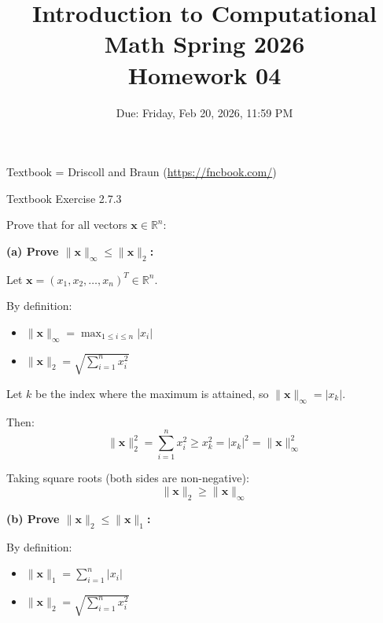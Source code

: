 \documentclass[reqno, answers]{exam}
\title{Introduction to Computational Math Spring 2026 \\ Homework 04}
\date{Due: Friday, Feb 20, 2026, 11:59 PM}
\author{}
\begin{document}
\maketitle
\thispagestyle{empty}

Textbook = Driscoll and Braun (\url{https://fncbook.com/})

\begin{questions}

\question Textbook Exercise 2.7.3

Prove that for all vectors $\mathbf{x} \in \mathbb{R}^n$:

\begin{solution}
\textbf{(a) Prove $\|\mathbf{x}\|_\infty \leq \|\mathbf{x}\|_2$:}

Let $\mathbf{x} = (x_1, x_2, \ldots, x_n)^T \in \mathbb{R}^n$.

By definition:
\begin{itemize}
    \item $\|\mathbf{x}\|_\infty = \max_{1 \leq i \leq n} |x_i|$
    \item $\|\mathbf{x}\|_2 = \sqrt{\sum_{i=1}^n x_i^2}$
\end{itemize}

Let $k$ be the index where the maximum is attained, so $\|\mathbf{x}\|_\infty = |x_k|$.

Then:
\[
\|\mathbf{x}\|_2^2 = \sum_{i=1}^n x_i^2 \geq x_k^2 = |x_k|^2 = \|\mathbf{x}\|_\infty^2
\]

Taking square roots (both sides are non-negative):
\[
\|\mathbf{x}\|_2 \geq \|\mathbf{x}\|_\infty
\]

\textbf{(b) Prove $\|\mathbf{x}\|_2 \leq \|\mathbf{x}\|_1$:}

By definition:
\begin{itemize}
    \item $\|\mathbf{x}\|_1 = \sum_{i=1}^n |x_i|$
    \item $\|\mathbf{x}\|_2 = \sqrt{\sum_{i=1}^n x_i^2}$
\end{itemize}


\end{solution}
\end{questions}
\end{document}

